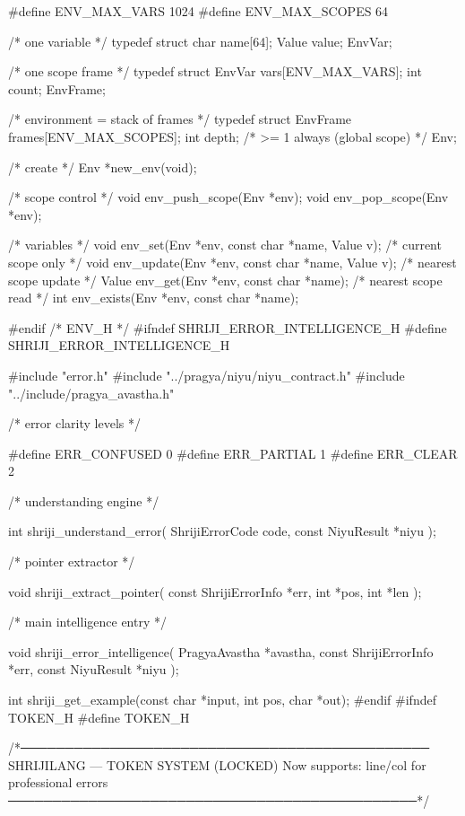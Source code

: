 \documentclass{article}
\begin{document}
#define ENV_MAX_VARS     1024
#define ENV_MAX_SCOPES   64

/* one variable */
typedef struct {
    char name[64];
    Value value;
} EnvVar;

/* one scope frame */
typedef struct {
    EnvVar vars[ENV_MAX_VARS];
    int count;
} EnvFrame;

/* environment = stack of frames */
typedef struct {
    EnvFrame frames[ENV_MAX_SCOPES];
    int depth; /* >= 1 always (global scope) */
} Env;

/* create */
Env *new_env(void);

/* scope control */
void env_push_scope(Env *env);
void env_pop_scope(Env *env);

/* variables */
void env_set(Env *env, const char *name, Value v);       /* current scope only */
void env_update(Env *env, const char *name, Value v);    /* nearest scope update */
Value env_get(Env *env, const char *name);               /* nearest scope read */
int env_exists(Env *env, const char *name);

#endif /* ENV_H */
#ifndef SHRIJI_ERROR_INTELLIGENCE_H
#define SHRIJI_ERROR_INTELLIGENCE_H

#include "error.h"
#include "../pragya/niyu/niyu_contract.h"
#include "../include/pragya_avastha.h"

/* error clarity levels */

#define ERR_CONFUSED 0
#define ERR_PARTIAL  1
#define ERR_CLEAR    2


/* understanding engine */

int shriji_understand_error(
    ShrijiErrorCode code,
    const NiyuResult *niyu
);


/* pointer extractor */

void shriji_extract_pointer(
    const ShrijiErrorInfo *err,
    int *pos,
    int *len
);


/* main intelligence entry */

void shriji_error_intelligence(
    PragyaAvastha *avastha,
    const ShrijiErrorInfo *err,
    const NiyuResult *niyu
);

int shriji_get_example(const char *input, int pos, char *out);
#endif
#ifndef TOKEN_H
#define TOKEN_H

/*──────────────────────────────────────────────
  SHRIJILANG — TOKEN SYSTEM (LOCKED)
  Now supports: line/col for professional errors
──────────────────────────────────────────────*/
\end{document}
